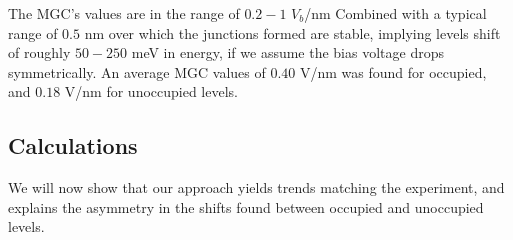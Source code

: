 \documentclass[aip,jcp,a4paper,reprint,floatfix,superscriptaddress]{revtex4-1}
\begin{document}
The MGC's values are 
in the range of $0.2-1$ $V_b$/nm 
Combined with a typical range of $0.5$ nm over which the junctions formed are stable, 
implying levels shift of roughly $50-250$ meV in energy, if we assume the bias voltage  drops symmetrically. An average MGC values of $0.40$ V/nm was found for occupied, and  $0.18$ V/nm for unoccupied levels.


\subsection{Calculations}\label{calculations}

We will now show that our approach yields trends matching the experiment, and explains the asymmetry in the shifts found between occupied and unoccupied levels. 









\end{document}
